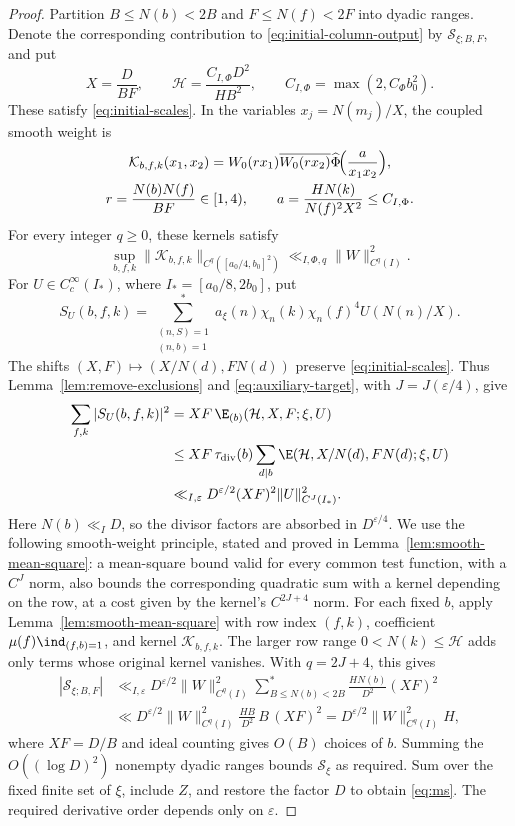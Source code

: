 \begin{proof}
Partition $B\le N(b)<2B$ and $F\le N(f)<2F$ into dyadic ranges.
Denote the corresponding contribution to
\eqref{eq:initial-column-output} by $\mathcal S_{\xi;B,F}$, and put
\[
 X=\frac D{BF},\qquad
 \mathcal H=\frac{C_{I,\Phi}D^2}{HB^2},\qquad
 C_{I,\Phi}=\max(2,C_\Phi b_0^2).
\]
These satisfy \eqref{eq:initial-scales}.
In the variables $x_j=N(m_j)/X$, the coupled smooth weight is
\[
 \begin{gathered}
 \mathcal K_{b,f,k}(x_1,x_2)
 =W_0(r x_1)\overline{W_0(r x_2)}
 \widehat\Phi\!\Bigl(\frac{a}{x_1x_2}\Bigr),\\
 r=\frac{N(b)N(f)}{BF}\in[1,4),\qquad
 a=\frac{HN(k)}{N(f)^2X^2}\le C_{I,\Phi}.
 \end{gathered}
\]
For every integer $q\ge0$, these kernels satisfy
\[
 \sup_{b,f,k}\|\mathcal K_{b,f,k}\|_{C^q([a_0/4,b_0]^2)}
 \ll_{I,\Phi,q}\|W\|_{C^q(I)}^2.
\]
For $U\in C_c^\infty(I_*)$, where $I_*=[a_0/8,2b_0]$, put
\[
 S_U(b,f,k)=\sum_{\substack{(n,S)=1\\(n,b)=1}}^*a_\xi(n)
       \chi_n(k)\chi_n(f)^4U(N(n)/X).
\]
The shifts $(X,F)\mapsto(X/N(d),FN(d))$ preserve
\eqref{eq:initial-scales}. Thus Lemma~\ref{lem:remove-exclusions}
and \eqref{eq:auxiliary-target}, with $J=J(\varepsilon/4)$, give
\[
 \begin{aligned}
 \sum_{f,k}|S_U(b,f,k)|^2
 &=XF\,\E_{(b)}(\mathcal H,X,F;\xi,U)\\
 &\le XF\,\tau_{\mathrm{div}}(b)
       \sum_{d\mid b}\E(\mathcal H,X/N(d),FN(d);\xi,U)\\
 &\ll_{I,\varepsilon}
 D^{\varepsilon/2}(XF)^2\|U\|_{C^J(I_*)}^2.
 \end{aligned}
\]
Here $N(b)\ll_I D$, so the divisor factors are absorbed in $D^{\varepsilon/4}$.
We use the following smooth-weight principle, stated and proved in
Lemma~\ref{lem:smooth-mean-square}: a mean-square bound valid for every
common test function, with a $C^J$ norm, also bounds the corresponding
quadratic sum with a kernel depending on the row, at a cost given by
the kernel's $C^{2J+4}$ norm.
For each fixed $b$, apply Lemma~\ref{lem:smooth-mean-square}
with row index $(f,k)$, coefficient $\mu(f)\ind_{(f,b)=1}$,
and kernel $\mathcal K_{b,f,k}$.
The larger row range $0<N(k)\le\mathcal H$ adds only terms
whose original kernel vanishes. With $q=2J+4$, this gives
\begin{equation}\label{eq:weighted}
 \begin{aligned}
 |\mathcal S_{\xi;B,F}|
 &\ll_{I,\varepsilon}
 D^{\varepsilon/2}\|W\|_{C^q(I)}^2
 \sum_{B\le N(b)<2B}^*\frac{HN(b)}{D^2}(XF)^2\\
 &\ll D^{\varepsilon/2}\|W\|_{C^q(I)}^2
 \frac{HB}{D^2}\,B\,(XF)^2
 =D^{\varepsilon/2}\|W\|_{C^q(I)}^2H,
 \end{aligned}
\end{equation}
where $XF=D/B$ and ideal counting gives $O(B)$ choices of $b$.
Summing the $O((\log D)^2)$ nonempty dyadic ranges bounds
$\mathcal S_\xi$ as required. Sum over the fixed finite set of $\xi$,
include $Z$, and restore the factor $D$ to obtain \eqref{eq:ms}.
The required derivative order depends only on $\varepsilon$.

\end{proof}

